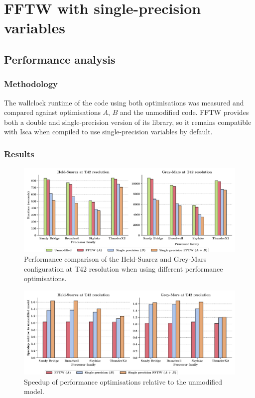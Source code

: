 \documentclass[a4paper,11pt]{report}
\begin{document}
\section{FFTW with single-precision variables}

\subsection{Performance analysis}

\subsubsection{Methodology}
The wallclock runtime of the code using both optimisations was measured and compared against optimisations $A$, $B$ and the unmodified code. FFTW provides both a double and single-precision version of its library, so it remains compatible with Isca when compiled to use single-precision variables by default.
\subsubsection{Results}
\begin{figure}[H]
\begin{center}
\includegraphics[width=\textwidth]{img/opt_comparison.pdf}
\caption[Runtimes of all optimisations]{Performance comparison of the Held-Suarez and Grey-Mars configuration at T42 resolution when using different performance optimisations.}
\label{fig:opt-comparison}
\end{center}
\end{figure}

\begin{figure}[H]
\begin{center}
\includegraphics[width=\textwidth]{img/speedup-opt.pdf}
\caption{Speedup of performance optimisations relative to the unmodified model.}
\label{fig:opt-comparison}
\end{center}
\end{figure}
\end{document}

